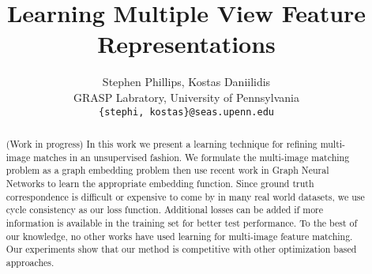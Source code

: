 \documentclass[10pt,twocolumn,letterpaper]{article}
\begin{document}
\title{Learning Multiple View Feature Representations}

\author{Stephen Phillips, Kostas Daniilidis \\
GRASP Labratory, University of Pennsylvania\\
{\tt\small \{stephi, kostas\}@seas.upenn.edu}
}



\maketitle


\begin{abstract}
   (Work in progress) In this work we present a learning technique for refining multi-image matches in an unsupervised fashion.
   We formulate the multi-image matching problem as a graph embedding problem then use recent work in Graph Neural Networks to learn the appropriate embedding function.
   Since ground truth correspondence is difficult or expensive to come by in many real world datasets, we use cycle consistency as our loss function.
   Additional losses can be added if more information is available in the training set for better test performance.
   To the best of our knowledge, no other works have used learning for multi-image feature matching.
   Our experiments show that our method is competitive with other optimization based approaches.
\end{abstract}
\end{document}
